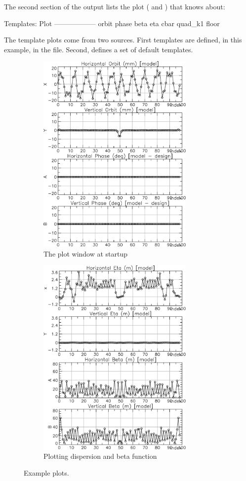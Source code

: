 The second section of the  output lists the plot  ( and
) that \tao knows about:
\begin{example}
 Templates:
   Plot               
   ------------------ 
   orbit              
   phase              
   beta               
   eta                
   cbar               
   quad_k1
   floor              
\end{example}
The template plots come from two sources. First templates are defined, in this example, in the
 file. Second, \tao defines a set of default templates.


\begin{figure}[tb]
  \centering
  \begin{subfigure}[b]{0.48\textwidth}
    \includegraphics[width=3in]{plot-page1.pdf}
    \caption{The plot window at startup}
    \label{f:plot.begin}
  \end{subfigure}
  \begin{subfigure}[b]{0.48\textwidth}
    \includegraphics[width=3in]{plot-eta-beta.pdf}
    \caption{Plotting dispersion and beta function}
    \label{f:plot.eta.beta}
  \end{subfigure}
  \caption{Example plots.}
\end{figure}

